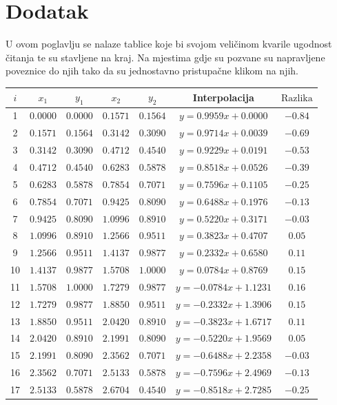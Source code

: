 \documentclass[12pt,a4paper]{report}
\begin{document}
\chapter{Dodatak}
	U ovom poglavlju se nalaze tablice koje bi svojom veličinom kvarile ugodnost čitanja te su stavljene na kraj. Na mjestima gdje su pozvane su napravljene poveznice do njih tako da su jednostavno pristupačne klikom na njih.
		\begin{table}
	\begin{center}		
		\begin{tabular}{c | c c | c c | c | c}
			$i$&$x_1$&$y_1$&$x_2$&$y_2$&Interpolacija&$\text{Razlika}$\\\hline
			1 &$0.0000$&$0.0000$&$0.1571$&$0.1564$&$y =  0.9959x+0.0000$&$-0.84$\\
			2 &$0.1571$&$0.1564$&$0.3142$&$0.3090$&$y =  0.9714x+0.0039$&$-0.69$\\
			3 &$0.3142$&$0.3090$&$0.4712$&$0.4540$&$y =  0.9229x+0.0191$&$-0.53$\\
			4 &$0.4712$&$0.4540$&$0.6283$&$0.5878$&$y =  0.8518x+0.0526$&$-0.39$\\
			5 &$0.6283$&$0.5878$&$0.7854$&$0.7071$&$y =  0.7596x+0.1105$&$-0.25$\\
			6 &$0.7854$&$0.7071$&$0.9425$&$0.8090$&$y =  0.6488x+0.1976$&$-0.13$\\
			7 &$0.9425$&$0.8090$&$1.0996$&$0.8910$&$y =  0.5220x+0.3171$&$-0.03$\\
			8 &$1.0996$&$0.8910$&$1.2566$&$0.9511$&$y =  0.3823x+0.4707$&$0.05$\\
			9 &$1.2566$&$0.9511$&$1.4137$&$0.9877$&$y =  0.2332x+0.6580$&$0.11$\\
			10 &$1.4137$&$0.9877$&$1.5708$&$1.0000$&$y =  0.0784x+0.8769$&$0.15$\\
			11 &$1.5708$&$1.0000$&$1.7279$&$0.9877$&$y = -0.0784x+1.1231$&$0.16$\\
			12 &$1.7279$&$0.9877$&$1.8850$&$0.9511$&$y = -0.2332x+1.3906$&$0.15$\\
			13 &$1.8850$&$0.9511$&$2.0420$&$0.8910$&$y = -0.3823x+1.6717$&$0.11$\\
			14 &$2.0420$&$0.8910$&$2.1991$&$0.8090$&$y = -0.5220x+1.9569$&$0.05$\\
			15 &$2.1991$&$0.8090$&$2.3562$&$0.7071$&$y = -0.6488x+2.2358$&$-0.03$\\
			16 &$2.3562$&$0.7071$&$2.5133$&$0.5878$&$y = -0.7596x+2.4969$&$-0.13$\\
			17 &$2.5133$&$0.5878$&$2.6704$&$0.4540$&$y = -0.8518x+2.7285$&$-0.25$\\

\end{tabular}
\end{center}
\end{table}
\end{document}
